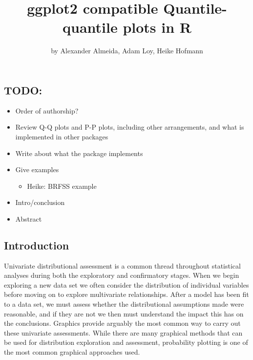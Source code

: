 \title{ggplot2 compatible Quantile-quantile plots in R}
\author{by Alexander Almeida, Adam Loy, Heike Hofmann}

\maketitle


\subsection{TODO:}\label{todo}

\begin{itemize}
\tightlist
\item
  Order of authorship?
\item
  Review Q-Q plots and P-P plots, including other arrangements, and what
  is implemented in other packages
\item
  Write about what the package implements
\item
  Give examples

  \begin{itemize}
  \tightlist
  \item
    Heike: BRFSS example
  \end{itemize}
\item
  Intro/conclusion
\item
  Abstract
\end{itemize}

\subsection{Introduction}\label{introduction}

\label{sec:introduction}

Univariate distributional assessment is a common thread throughout
statistical analyses during both the exploratory and confirmatory
stages. When we begin exploring a new data set we often consider the
distribution of individual variables before moving on to explore
multivariate relationships. After a model has been fit to a data set, we
must assess whether the distributional assumptions made were reasonable,
and if they are not we then must understand the impact this has on the
conclusions. Graphics provide arguably the most common way to carry out
these univariate assessments. While there are many graphical methods
that can be used for distribution exploration and assessment,
probability plotting is one of the most common graphical approaches
used.

